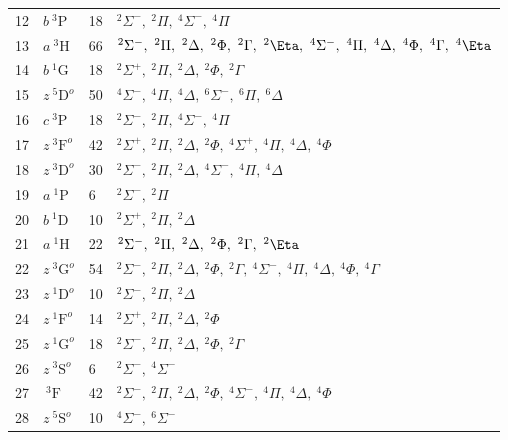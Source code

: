 \begin{table*}[]
\begin{tabular*}{\textwidth}{llll@{\extracolsep{\fill}}}
  12 & $   b~^3\mathrm{P} $ &   18& $   ^{2}\Sigma^-,\  ^{2}\Pi,\   ^{4}\Sigma^-,\  ^{4}\Pi$ \\
  13 & $   a~^3\mathrm{H} $ &   66& $   ^{2}\Sigma^-,\  ^{2}\Pi,\     ^{2}\Delta,\ ^{2}\Phi,\     ^{2}\Gamma,\ ^{2}\Eta,\   ^{4}\Sigma^-,\  ^{4}\Pi,\     ^{4}\Delta,\ ^{4}\Phi,\     ^{4}\Gamma,\ ^{4}\Eta$ \\
  14 & $   b~^1\mathrm{G} $ &   18& $   ^{2}\Sigma^+,\  ^{2}\Pi,\     ^{2}\Delta,\ ^{2}\Phi,\     ^{2}\Gamma$ \\
  15 & $ z~^5\mathrm{D}^o $ &   50& $   ^{4}\Sigma^-,\  ^{4}\Pi,\     ^{4}\Delta,\   ^{6}\Sigma^-,\  ^{6}\Pi,\     ^{6}\Delta$ \\
  16 & $   c~^3\mathrm{P} $ &   18& $   ^{2}\Sigma^-,\  ^{2}\Pi,\   ^{4}\Sigma^-,\  ^{4}\Pi$ \\
  17 & $ z~^3\mathrm{F}^o $ &   42& $   ^{2}\Sigma^+,\  ^{2}\Pi,\     ^{2}\Delta,\ ^{2}\Phi,\   ^{4}\Sigma^+,\  ^{4}\Pi,\     ^{4}\Delta,\ ^{4}\Phi$ \\
  18 & $ z~^3\mathrm{D}^o $ &   30& $   ^{2}\Sigma^-,\  ^{2}\Pi,\     ^{2}\Delta,\   ^{4}\Sigma^-,\  ^{4}\Pi,\     ^{4}\Delta$ \\
  19 & $   a~^1\mathrm{P} $ &    6& $   ^{2}\Sigma^-,\  ^{2}\Pi$ \\
  20 & $   b~^1\mathrm{D} $ &   10& $   ^{2}\Sigma^+,\  ^{2}\Pi,\     ^{2}\Delta$ \\
  21 & $   a~^1\mathrm{H} $ &   22& $   ^{2}\Sigma^-,\  ^{2}\Pi,\     ^{2}\Delta,\ ^{2}\Phi,\     ^{2}\Gamma,\ ^{2}\Eta$ \\
  22 & $ z~^3\mathrm{G}^o $ &   54& $   ^{2}\Sigma^-,\  ^{2}\Pi,\     ^{2}\Delta,\ ^{2}\Phi,\     ^{2}\Gamma,\   ^{4}\Sigma^-,\  ^{4}\Pi,\     ^{4}\Delta,\ ^{4}\Phi,\     ^{4}\Gamma$ \\
  23 & $ z~^1\mathrm{D}^o $ &   10& $   ^{2}\Sigma^-,\  ^{2}\Pi,\     ^{2}\Delta$ \\
  24 & $ z~^1\mathrm{F}^o $ &   14& $   ^{2}\Sigma^+,\  ^{2}\Pi,\     ^{2}\Delta,\ ^{2}\Phi$ \\
  25 & $ z~^1\mathrm{G}^o $ &   18& $   ^{2}\Sigma^-,\  ^{2}\Pi,\     ^{2}\Delta,\ ^{2}\Phi,\     ^{2}\Gamma$ \\
  26 & $ z~^3\mathrm{S}^o $ &    6& $   ^{2}\Sigma^-,\   ^{4}\Sigma^-$ \\
  27 & $    ~^3\mathrm{F} $ &   42& $   ^{2}\Sigma^-,\  ^{2}\Pi,\     ^{2}\Delta,\ ^{2}\Phi,\   ^{4}\Sigma^-,\  ^{4}\Pi,\     ^{4}\Delta,\ ^{4}\Phi$ \\
  28 & $ z~^5\mathrm{S}^o $ &   10& $   ^{4}\Sigma^-,\   ^{6}\Sigma^-$ \\

\end{tabular*}
\end{table*}
